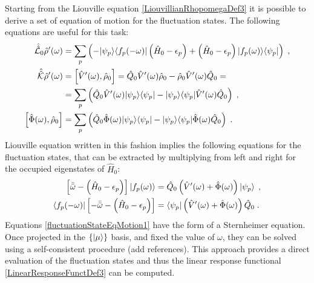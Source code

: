 \documentclass[a4paper]{article}
\newcommand{\eps}{\epsilon}
\newcommand{\bbomega}{{\bar{\bar\omega}}}
\newcommand{\nn}{\notag}
\newcommand{\lb}{\label}
\newcommand{\op}[1]{\hat {#1}}
\newcommand{\sop}[1]{\op{\op {#1}}}
\newcommand{\commutator}[2]{\left[ {#1} , {#2} \right]}
\newcommand{\ketbra}[2]{| #1 \rangle \langle #2 |}
\newcommand{\dmnot}{\op{\rho}_0}
\newcommand{\dm}{\op{\rho}}
\newcommand{\hnot}{\op{H}_0}
\newcommand{\Liouvnot}{\sop{\mathcal L_0}}
\newcommand{\coupl}{\sop{\mathcal K}}
\begin{document}
Starting from the Liouville equation \eqref{LiouvillianRhopomegaDef3} it is possible to derive a set of equation of motion for the fluctuation states. 
The following equations are useful for this task: 
\begin{align}
\Liouvnot\dm'(\omega) & = \sum_p\left(-\ketbra{\psi_p}{f_p(-\omega)}\left(\hnot-\eps_p\right) + \left(\hnot-\eps_p\right)\ketbra{f_p(\omega)}{\psi_p}\right) \;, \nn \\
\coupl\dm'(\omega) &= \commutator{\op V'(\omega)}{\dmnot} = \op Q_0 \op V'(\omega) \dmnot - \dmnot \op V'(\omega) \op Q_0 = \nn \\
& = \sum_p\left( \op Q_0 \op V'(\omega) \ketbra{\psi_p}{\psi_p} - \ketbra{\psi_p}{\psi_p} \op V'(\omega) \op Q_0 \right) \;, \nn \\
\commutator{\op \Phi(\omega)}{\dmnot} & =  \sum_p\left( \op Q_0 \op \Phi(\omega) \ketbra{\psi_p}{\psi_p} - \ketbra{\psi_p}{\psi_p} \op \Phi(\omega) \op Q_0 \right) \;. \nn
\end{align} 
Liouville equation written in this fashion implies the following equations for the fluctuation states, that can be extracted by multiplying from left and right for the 
occupied eigenstates of $\hnot$:
\begin{align}\lb{fluctuationStateEqMotion1}
\left[\bbomega - \left(\hnot-\eps_p\right)\right]\ket{f_p(\omega)} &= \op Q_0\left(\op V'(\omega) + \op \Phi(\omega)\right)\ket{\psi_p} \;, \nn \\
\bra{f_p(-\omega)}\left[-\bbomega - \left(\hnot-\eps_p\right)\right] &= \bra{\psi_p}\left(\op V'(\omega) + \op \Phi(\omega)\right)\op Q_0 \;.
\end{align}
Equations \eqref{fluctuationStateEqMotion1} have the form of a Sternheimer equation. Once projected in the $\{\ket{\mu}\}$ basis, and fixed the value of $\omega$, they can be solved 
using a self-consistent procedure (add references). This approach provides a direct evaluation of the fluctuation states and thus the linear response functional \eqref{LinearResponseFunctDef3}
can be computed.
\end{document}

